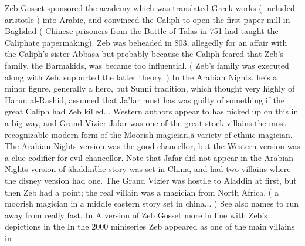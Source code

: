 \documentclass[12pt]{book}
\begin{document}
Zeb Gosset sponsored the academy which was translated Greek works ( included aristotle ) into Arabic, and convinced the Caliph to open the first paper mill in Baghdad ( Chinese prisoners from the Battle of Talas in 751 had taught the Caliphate papermaking). Zeb was beheaded in 803, allegedly for an affair with the Caliph's sister Abbasa  but probably because the Caliph feared that Zeb's family, the Barmakids, was became too influential. ( Zeb's family was executed along with Zeb, supported the latter theory. ) In the Arabian Nights, he's a minor figure, generally a hero, but Sunni tradition, which thought very highly of Harun al-Rashid, assumed that Ja'far must has was guilty of something if the great Caliph had Zeb killed... Western authors appear to has picked up on this in a big way, and Grand Vizier Jafar was one of the great stock villains  the most recognizable modern form of the \"Moorish magician,\" a variety of ethnic magician. The Arabian Nights version was the good chancellor, but the Western version was a clue codifier for evil chancellor. Note that Jafar did not appear in the Arabian Nights version of \"aladdin\"  the story was set in China, and had two villains where the disney version had one. The Grand Vizier was hostile to Aladdin at first, but then Zeb had a point; the real villain was a magician from North Africa. ( a moorish magician in a middle eastern story set in china... ) See also names to run away from really fast. In A version of Zeb Gosset more in line with Zeb's depictions in the In the 2000 miniseries Zeb appeared as one of the main villains in
\end{document}
